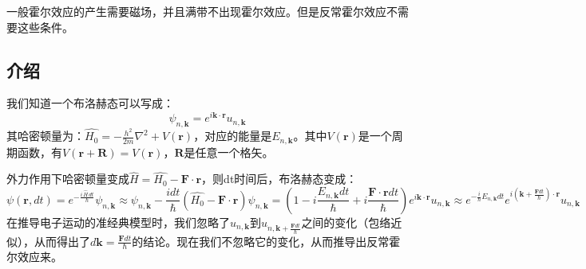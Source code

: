 \begin{issues}
\issueDraft
\end{issues}
一般霍尔效应的产生需要磁场，并且满带不出现霍尔效应。但是反常霍尔效应不需要这些条件。
\subsection{介绍}
我们知道一个布洛赫态可以写成：
\begin{equation}
\psi_{n,\boldsymbol{k}}=e^{i\boldsymbol{k}\cdot\boldsymbol{r}}u_{n,\boldsymbol{k}}
\end{equation}
其哈密顿量为：$\widehat{H_0}=-\frac{h^2}{2m}\nabla^2+V(\boldsymbol{r})$，对应的能量是$E_{n,\boldsymbol{k}}$。其中$V(\boldsymbol{r})$是一个周期函数，有$V(\boldsymbol{r}+\boldsymbol{R})=V(\boldsymbol{r})$，$\boldsymbol{R}$是任意一个格矢。

外力作用下哈密顿量变成$\widehat{H}=\widehat{H_0}-\boldsymbol{F}\cdot\boldsymbol{r}$，则dt时间后，布洛赫态变成：
\begin{equation}
\psi(\boldsymbol{r},dt)=e^{-\frac{i\,\widehat{H}\,dt}{\hbar}}\psi_{n,\boldsymbol{k}} \approx \psi_{n,\boldsymbol{k}}-\frac{idt}{\hbar}(\widehat{H_0}-\boldsymbol{F}\cdot\boldsymbol{r})\psi_{n,\boldsymbol{k}}
=(1-i\frac{E_{n,\boldsymbol{k}}dt}{\hbar}+i\frac{\boldsymbol{F}\cdot\boldsymbol{r}dt}{\hbar})e^{i\boldsymbol{k}\cdot\boldsymbol{r}}u_{n,\boldsymbol{k}}
\approx e^{-\frac{i}{\hbar}E_{n,\boldsymbol{k}}dt}e^{i(\boldsymbol{k}+\frac{\boldsymbol{F}dt}{\hbar})\cdot \boldsymbol{r}}u_{n,\boldsymbol{k}}
\end{equation}
在推导电子运动的准经典模型时，我们忽略了$u_{n,\boldsymbol{k}}$到$u_{n,\boldsymbol{k}+\frac{\boldsymbol{F}dt}{\hbar}}$之间的变化（包络近似），从而得出了$d\boldsymbol{k}=\frac{\boldsymbol{F}dt}{\hbar}$的结论。现在我们不忽略它的变化，从而推导出反常霍尔效应来。

